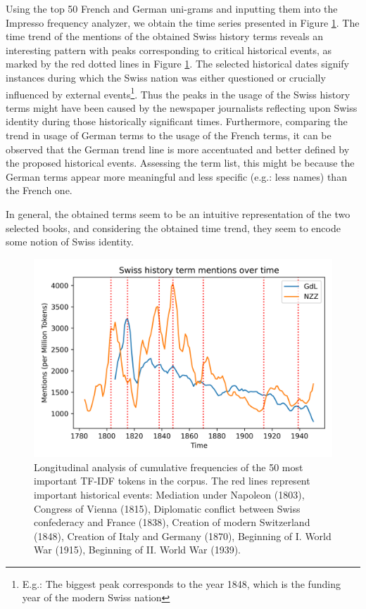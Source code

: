 \documentclass[11pt]{article}
\begin{document}
Using the top 50 French and German uni-grams and inputting them into the Impresso frequency analyzer, we obtain the time series presented in Figure \ref{fig:cumulative_history}. The time trend of the mentions of the obtained Swiss history terms reveals an interesting pattern with peaks corresponding to critical historical events, as marked by the red dotted lines in Figure \ref{fig:cumulative_history}. The selected historical dates signify instances during which the Swiss nation was either questioned or crucially influenced by external events\footnote{E.g.: The biggest peak corresponds to the year 1848, which is the funding year of the modern Swiss nation}. Thus the peaks in the usage of the Swiss history terms might have been caused by the newspaper journalists reflecting upon Swiss identity during those historically significant times. 
Furthermore, comparing the trend in usage of German terms to the usage of the French terms, it can be observed that the German trend line is more accentuated and better defined by the proposed historical events. Assessing the term list, this might be because the German terms appear more meaningful and less specific (e.g.: less names) than the French one. \par
In general, the obtained terms seem to be an intuitive representation of the two selected books, and considering the obtained time trend, they seem to encode some notion of Swiss identity.

\begin{figure}[H]
    \centering
    \includegraphics[width=1\linewidth]{figures/History_swiss_identity.png}
    \caption{Longitudinal analysis of cumulative frequencies of the 50 most important TF-IDF tokens in the corpus. The red lines represent important historical events:
Mediation under Napoleon (1803), Congress of Vienna (1815), Diplomatic conflict between Swiss confederacy and France (1838), Creation of modern Switzerland (1848), Creation of Italy and Germany (1870), Beginning of I. World War (1915), Beginning of II. World War (1939).
}
    \label{fig:cumulative_history}
\end{figure}
\end{document}
